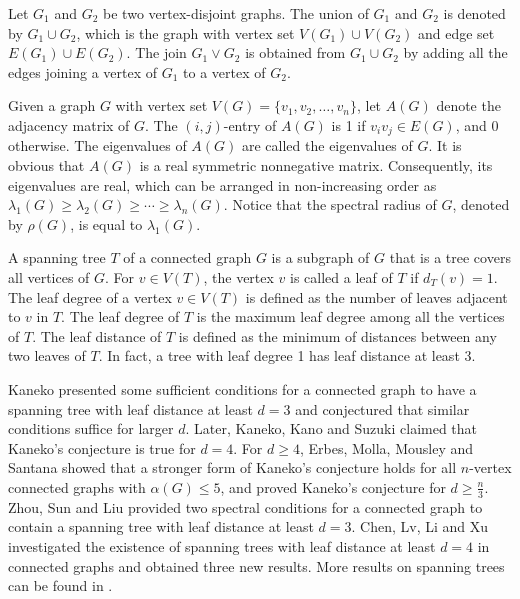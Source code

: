 \documentclass[10pt]{article}
\numberwithin{equation}{section}
\begin{document}
Let $G_1$ and $G_2$ be two vertex-disjoint graphs. The union of $G_1$ and $G_2$ is denoted by $G_1\cup G_2$, which is the graph with vertex set
$V(G_1)\cup V(G_2)$ and edge set $E(G_1)\cup E(G_2)$. The join $G_1\vee G_2$ is obtained from $G_1\cup G_2$ by adding all the edges joining a
vertex of $G_1$ to a vertex of $G_2$.

Given a graph $G$ with vertex set $V(G)=\{v_1,v_2,\ldots,v_n\}$, let $A(G)$ denote the adjacency matrix of $G$. The $(i,j)$-entry of $A(G)$ is 1
if $v_iv_j\in E(G)$, and 0 otherwise. The eigenvalues of $A(G)$ are called the eigenvalues of $G$. It is obvious that $A(G)$ is a real symmetric
nonnegative matrix. Consequently, its eigenvalues are real, which can be arranged in non-increasing order as
$\lambda_1(G)\geq\lambda_2(G)\geq\cdots\geq\lambda_n(G)$. Notice that the spectral radius of $G$, denoted by $\rho(G)$, is equal to $\lambda_1(G)$.

A spanning tree $T$ of a connected graph $G$ is a subgraph of $G$ that is a tree covers all vertices of $G$. For $v\in V(T)$, the vertex $v$ is
called a leaf of $T$ if $d_T(v)=1$. The leaf degree of a vertex $v\in V(T)$ is defined as the number of leaves adjacent to $v$ in $T$. The leaf
degree of $T$ is the maximum leaf degree among all the vertices of $T$. The leaf distance of $T$ is defined as the minimum of distances between
any two leaves of $T$. In fact, a tree with leaf degree 1 has leaf distance at least 3.

Kaneko \cite{Ks} presented some sufficient conditions for a connected graph to have a spanning tree with leaf distance at least $d=3$ and
conjectured that similar conditions suffice for larger $d$. Later, Kaneko, Kano and Suzuki \cite{KKS} claimed that Kaneko's conjecture is true
for $d=4$. For $d\geq4$, Erbes, Molla, Mousley and Santana \cite{EMMS} showed that a stronger form of Kaneko's conjecture holds for all $n$-vertex
connected graphs with $\alpha(G)\leq5$, and proved Kaneko's conjecture for $d\geq\frac{n}{3}$. Zhou, Sun and Liu \cite{ZSL3} provided two spectral
conditions for a connected graph to contain a spanning tree with leaf distance at least $d=3$. Chen, Lv, Li and Xu \cite{CLLX} investigated the
existence of spanning trees with leaf distance at least $d=4$ in connected graphs and obtained three new results. More results on spanning trees
can be found in \cite{GS,Kyaw,MM,ZW,ZZL,Wc}.
\end{document}
